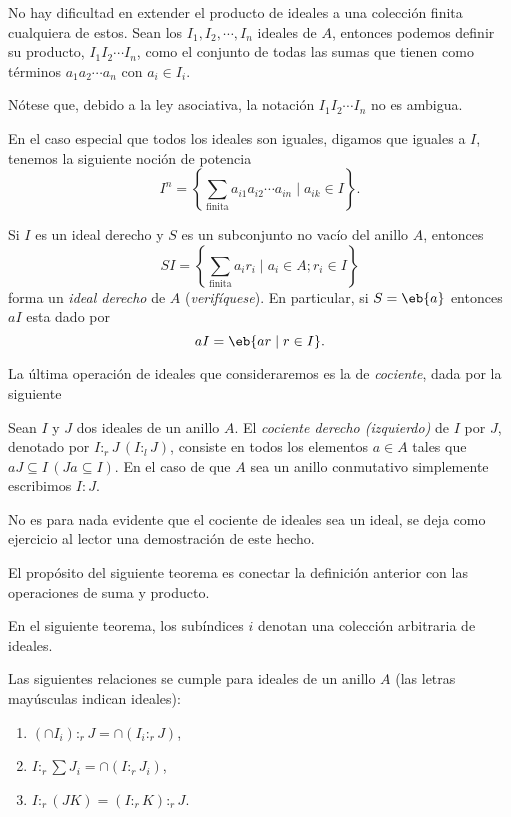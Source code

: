 No hay dificultad en extender el producto de ideales a una colección finita cualquiera de estos. Sean los $I_1,I_2,\cdots,I_n$ ideales de $A$, entonces podemos definir su producto, $I_1I_2\cdots I_n$, como el conjunto de todas las sumas que tienen como términos $a_1a_2\cdots a_n$ con $a_i\in I_i$.

\begin{nota}
	Nótese que, debido a la ley asociativa, la notación $I_1I_2\cdots I_n$ no es ambigua.
\end{nota}
	En el caso especial que todos los ideales son iguales, digamos que iguales a $I$, tenemos la siguiente noción de potencia
\[ I^n = \left\{ \sum_{\text{finita}} a_{i1}a_{i2}\cdots a_{in} \mid a_{ik}\in I \right\}. \]

\begin{obs}
	Si $I$ es un ideal derecho y $S$ es un subconjunto no vacío del anillo $A$, entonces
	\[ SI = \left\{ \sum_{\text{finita}} a_ir_i \mid a_i\in A; r_i\in I \right\} \]
	forma un \textit{ideal derecho} de $A$ (\textit{verifíquese}). En particular, si $S=\eb{a}$ entonces $aI$ esta dado por
	\[ aI = \eb{ar \mid r\in I}. \]
\end{obs}
La última operación de ideales que consideraremos es la de \textit{cociente}, dada por la siguiente 

\begin{defi}[cociente]
	Sean $I$ y $J$ dos ideales de un anillo $A$. 
	El \textit{cociente derecho (izquierdo)} de $I$ por $J$, denotado por $I:_rJ \, (I:_lJ)$, consiste en todos los elementos $a\in A$ tales que $aJ \subseteq I \, (Ja \subseteq I)$. En el caso de que $A$ sea un anillo conmutativo simplemente escribimos $I:J$.
\end{defi} 
No es para nada evidente que el cociente de ideales sea un ideal, se deja como ejercicio al lector una demostración de este hecho.

El propósito del siguiente teorema es conectar la definición anterior con las operaciones de suma y producto.

\begin{nota}
	En el siguiente teorema, los subíndices $i$ denotan una colección arbitraria de ideales.
\end{nota}
\begin{teo} 
	Las siguientes relaciones se cumple para ideales de un anillo $A$ (las letras mayúsculas indican ideales):
	\begin{enumerate}
		\item $ ( \cap I_i )\mathpunct{:}_r J = \cap (I_i\mathpunct{:}_r J)$,
		\item $I\mathpunct{:}_r \sum J_i = \cap (I\mathpunct{:}_r J_i)$,
		\item $I\mathpunct{:}_r(JK) = (I\mathpunct{:}_rK)\mathpunct{:}_r J$.
	\end{enumerate}
\end{teo} 

